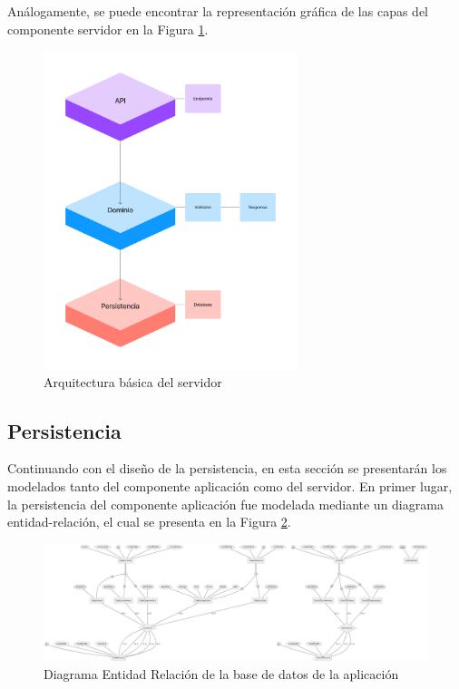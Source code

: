             Análogamente, se puede encontrar la representación gráfica de las capas del componente servidor en la Figura \ref{figure:disenio:arquitectura_servidor}.
            
            \begin{figure}[h]
                \centering
                \includegraphics[width=0.66\textwidth]{figures/diseno/Servidor pila.png}
                \caption{Arquitectura básica del servidor}
                \label{figure:disenio:arquitectura_servidor}
            \end{figure}
            
    
        \subsection{Persistencia}

            Continuando con el diseño de la persistencia, en esta sección se presentarán los modelados tanto del componente aplicación como del servidor. En primer lugar, la persistencia del componente aplicación fue modelada mediante un diagrama entidad-relación, el cual se presenta en la Figura \ref{figure:disenio:diagrama_er}.
            
            \begin{figure}
                \centering
                \includegraphics[width=1\textwidth]{figures/bd/ER simple.png}
                \caption{Diagrama Entidad Relación de la base de datos de la aplicación}
                \label{figure:disenio:diagrama_er}
            \end{figure}

